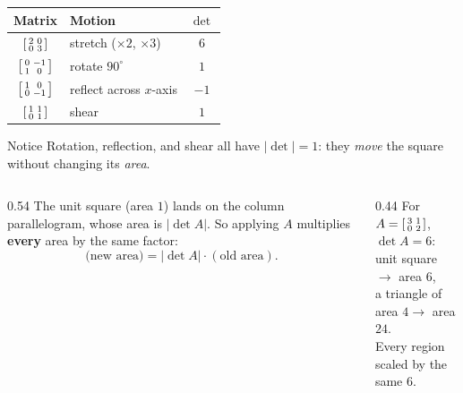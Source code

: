 \documentclass[aspectratio=169, 11pt]{beamer}
\begin{document}
\begin{frame}[t, plain]
  \begin{center}
  \renewcommand{\arraystretch}{1.5}
  \begin{tabular}{@{}c l c@{}}
  \textbf{Matrix} & \textbf{Motion} & $\det$ \\
  \hline
  $\begin{bsmallmatrix} 2 & 0 \\ 0 & 3 \end{bsmallmatrix}$ & stretch ($\times2$, $\times3$) & $6$ \\
  $\begin{bsmallmatrix} 0 & -1 \\ 1 & 0 \end{bsmallmatrix}$ & rotate $90^\circ$ & $1$ \\
  $\begin{bsmallmatrix} 1 & 0 \\ 0 & -1 \end{bsmallmatrix}$ & reflect across $x$-axis & $-1$ \\
  $\begin{bsmallmatrix} 1 & 1 \\ 0 & 1 \end{bsmallmatrix}$ & shear & $1$ \\
  \end{tabular}
  \end{center}
  \begin{block}{Notice}
    Rotation, reflection, and shear all have $|\det|=1$: they \emph{move} the square without changing its
    \emph{area}.
  \end{block}
\end{frame}

\begin{frame}[t, plain]
  \begin{columns}[T]
    \begin{column}{0.54\textwidth}
      The unit square (area $1$) lands on the column parallelogram, whose area is $|\det A|$. So applying
      $A$ multiplies \textbf{every} area by the same factor:
      \[ \text{(new area)} = |\det A|\cdot(\text{old area}). \]
    \end{column}
    \begin{column}{0.44\textwidth}
      \centering
      For $A=\begin{bsmallmatrix} 3 & 1\\ 0 & 2 \end{bsmallmatrix}$, $\det A=6$:\\[6pt]
      unit square $\to$ area $6$,\\[2pt]
      a triangle of area $4 \to$ area $24$.\\[6pt]
      {\scriptsize Every region scaled by the same $6$.}
    \end{column}
  \end{columns}
\end{frame}
\end{document}

